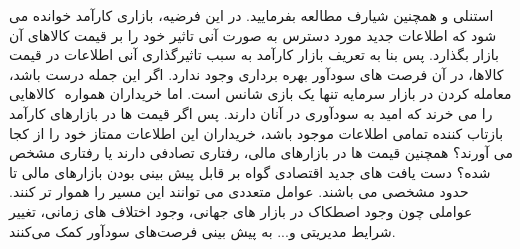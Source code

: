 \documentclass[a4paper,titlepage,12pt,fleqn,oneside]{report}
\begin{document}
	استنلی\cite{stan} و همچنین شیارف \cite{shia}مطالعه بفرمایید.  در این فرضیه، بازاری کارآمد خوانده می شود که اطلاعات جدید مورد دسترس به صورت آنی تاثیر خود را بر قیمت کالاهای آن بازار بگذارد. پس بنا به تعریف بازار کارآمد به سبب تاثیرگذاری آنی اطلاعات در قیمت کالاها، در آن فرصت های سودآور بهره برداری وجود ندارد.  اگر این جمله درست باشد، معامله کردن در بازار سرمایه تنها یک بازی شانس است.  اما خریداران همواره ‏ کالاهایی را می خرند که امید به سودآوری در آنان دارند.  پس اگر قیمت ها در بازارهای کارآمد بازتاب کننده تمامی اطلاعات موجود باشد،  خریداران این اطلاعات ممتاز خود را از کجا می آورند؟ همچنین قیمت ها در بازارهای مالی، رفتاری تصادفی دارند یا رفتاری مشخص شده؟
	دست یافت های جدید اقتصادی گواه بر قابل پیش بینی بودن بازارهای مالی تا حدود مشخصی می باشند.  عوامل متعددی می توانند این مسیر را هموار تر کنند.  عواملی چون  وجود اصطکاک در بازار های جهانی،  وجود اختلاف های زمانی،  تغییر شرایط مدیریتی و... به پیش بینی فرصت‌های سودآور کمک می‌کنند.
\end{document}
